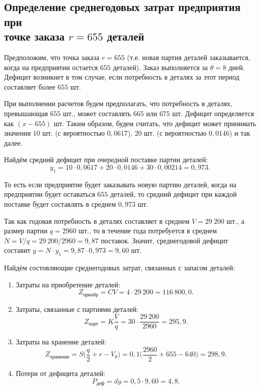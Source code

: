 \subsection{Определение среднегодовых затрат предприятия при \\ точке заказа $r = 655$ деталей}

Предположим, что точка заказа $r=655$ (т.е. новая партия деталей заказывается,
когда на предприятии остается $655$ деталей). Заказ выполняется за $\theta=8$ дней.
Дефицит возникнет в том случае, если потребность в деталях за этот период
составляет более $655$ шт.

При выполнении расчетов будем предполагать, что потребность в деталях,
превышающая $655$ шт., может составлять $665$ или $675$ шт.
Дефицит определяется как $(x - 655)$ шт. Таким образом, будем считать,
что дефицит может принимать значения $10$ шт. (с вероятностью $0{,}0617$),
$20$ шт. (с вероятностью $0{,}0146$) и так далее.

Найдём средний дефицит при очередной поставке партии деталей:
\[
	y_1 = 10 \cdot 0{,}0617 + 20 \cdot 0{,}0146 + 30 \cdot 0{,}00214 = 0{,}973.
\]

То есть если предприятие будет заказывать новую партию деталей,
когда на предприятии будет оставаться $655$ деталей, то средний
дефицит при каждой поставке будет составлять в среднем $0{,}973$ шт.

Так как годовая потребность в деталях составляет в среднем $V=29\:200$ шт.,
а размер партии $q = 2960$ шт., то в течение года потребуется
в среднем $N = V/q = 29\:200 / 2960 = 9{,}87$ поставок.
Значит, среднегодовой дефицит составит $y=N \cdot y_1=9{,}87 \cdot 0{,}973 =9{,}60$ шт.

Найдём состовляющие среднегодовых затрат, связанных с запасом деталей:
\begin{enumerate}
	\item Затраты на приобретение деталей:
		\[Z_{\text{приобр}} = CV = 4 \cdot 29\:200 = 116\:800{,}0.\]
	\item Затраты, связанные с партиями деталей:
		\[Z_{\text{парт}} = K \dfrac{V}{q} = 30 \cdot \dfrac{29\:200}{2960} = 295{,}9. \]
	\item Затраты на хранение деталей:
		\[Z_{\text{хранение}} = S\Big(\dfrac{q}{2} + r - V_\theta\Big) = 0{,}1\Big(\dfrac{2960}{2} + 655 - 640\Big) = 298{,}9.\]
	\item Потери от дефицита деталей:
		\[P_{\text{деф}} = dy = 0{,}5 \cdot 9{,}60 = 4{,}8.\]
\end{enumerate}

